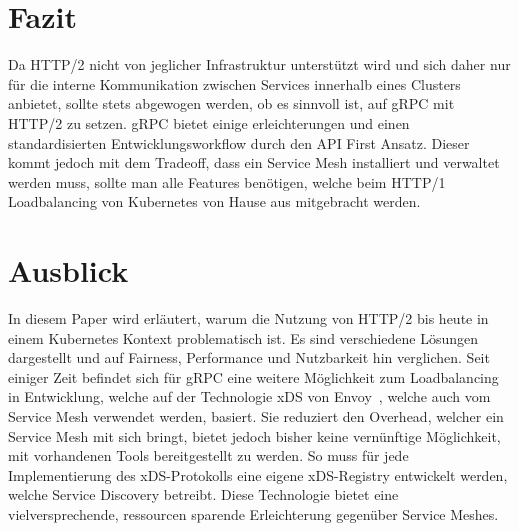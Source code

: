 \documentclass[a4paper,12pt]{article}
\begin{document}
    \section{Fazit}\label{sec:fazit}

    Da HTTP/2 nicht von jeglicher Infrastruktur unterstützt wird und sich daher nur für die interne Kommunikation zwischen Services innerhalb eines Clusters anbietet, sollte stets abgewogen werden, ob es sinnvoll ist, auf gRPC mit HTTP/2 zu setzen.
    gRPC bietet einige erleichterungen und einen standardisierten Entwicklungsworkflow durch den API First Ansatz.
    Dieser kommt jedoch mit dem Tradeoff, dass ein Service Mesh installiert und verwaltet werden muss, sollte man alle Features benötigen, welche beim HTTP/1 Loadbalancing von Kubernetes von Hause aus mitgebracht werden.

    \newpage

    \section{Ausblick}\label{sec:ausblick}

    In diesem Paper wird erläutert, warum die Nutzung von HTTP/2 bis heute in einem Kubernetes Kontext problematisch ist.
    Es sind verschiedene Lösungen dargestellt und auf Fairness, Performance und Nutzbarkeit hin verglichen.
    Seit einiger Zeit befindet sich für gRPC eine weitere Möglichkeit zum Loadbalancing in Entwicklung, welche auf der Technologie xDS von Envoy~\cite{xds}, welche auch vom Service Mesh verwendet werden, basiert.
    Sie reduziert den Overhead, welcher ein Service Mesh mit sich bringt, bietet jedoch bisher keine vernünftige Möglichkeit, mit vorhandenen Tools bereitgestellt zu werden.
    So muss für jede Implementierung des xDS-Protokolls eine eigene xDS-Registry entwickelt werden, welche Service Discovery betreibt.
    Diese Technologie bietet eine vielversprechende, ressourcen sparende Erleichterung gegenüber Service Meshes.

    \appendix

    \newpage

    
    
\end{document}
